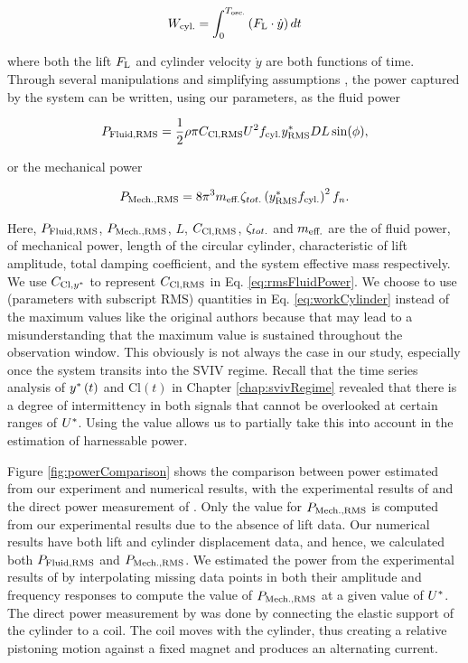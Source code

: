 \documentclass[oneside]{utmthesis}
\begin{document}
\begin{equation}
  W_{\text{cyl.}} = \int_{0}^{T_{\text{osc.}}} \left ( F_{\text{L}} \cdot \dot{y} \right ) dt
  \label{eq:workCylinder}
\end{equation}

\noindent where both the lift $F_{\text{L}}$ and cylinder velocity $\dot{y}$ are both functions of time. Through several manipulations and simplifying assumptions \citep{Sun2016}, the power captured by the system can be written, using our parameters, as the fluid power

\begin{equation}
  P_{\text{Fluid,RMS}} = \frac{1}{2} \rho \pi C_{\text{Cl},\text{RMS}} U^{2} f_{\text{cyl.}} y^{*}_{\text{RMS}} D L \sin(\phi),
  \label{eq:rmsFluidPower}
\end{equation}

\noindent or the mechanical power

\begin{equation}
  P_{\text{Mech.,RMS}} = 8 \pi^{3} m_{\text{eff.}} \zeta_{tot.} \left (y^{*}_{\text{RMS}} f_{\text{cyl.}} \right )^{2} f_{n}.
  \label{eq:rmsMechPower}
\end{equation}

Here, $P_{\text{Fluid,RMS}}$, $P_{\text{Mech.,RMS}}$, $L$, $C_{\text{Cl},\text{RMS}}$, $\zeta_{tot.}$ and $m_{\text{eff.}}$ are the \rms{} of fluid power, \rms{} of mechanical power, length of the circular cylinder, characteristic \rms{} of lift amplitude, total damping coefficient, and the system effective mass respectively. We use $C_{\text{Cl},y^{*}}$ to represent $C_{\text{Cl},\text{RMS}}$ in Eq. \ref{eq:rmsFluidPower}. We choose to use \rms{} (parameters with subscript RMS) quantities in Eq. \ref{eq:workCylinder} instead of the maximum values like the original authors because that may lead to a misunderstanding that the maximum value is sustained throughout the observation window. This obviously is not always the case in our study, especially once the system transits into the SVIV regime. Recall that the time series analysis of $y^{*}\left( t \right)$ and $\text{Cl}\left( t \right)$ in Chapter \ref{chap:svivRegime} revealed that there is a degree of intermittency in both signals that cannot be overlooked at certain ranges of $U^{*}$. Using the \rms{} value allows us to partially take this into account in the estimation of harnessable power.

Figure \ref{fig:powerComparison} shows the comparison between power estimated from our experiment and numerical results, with the experimental results of \citet{Nguyen2012} and the direct power measurement of \citet{Koide2013}. Only the value for $P_{\text{Mech.,RMS}}$ is computed from our experimental results due to the absence of lift data. Our numerical results have both lift and cylinder displacement data, and hence, we calculated both $P_{\text{Fluid,RMS}}$ and $P_{\text{Mech.,RMS}}$. We estimated the power from the experimental results of \citet{Nguyen2012} by interpolating missing data points in both their amplitude and frequency responses to compute the value of $P_{\text{Mech.,RMS}}$ at a given value of $U^{*}$. The direct power measurement by \citet{Koide2013} was done by connecting the elastic support of the cylinder to a coil. The coil moves with the cylinder, thus creating a relative pistoning motion against a fixed magnet and produces an alternating current.
\end{document}
